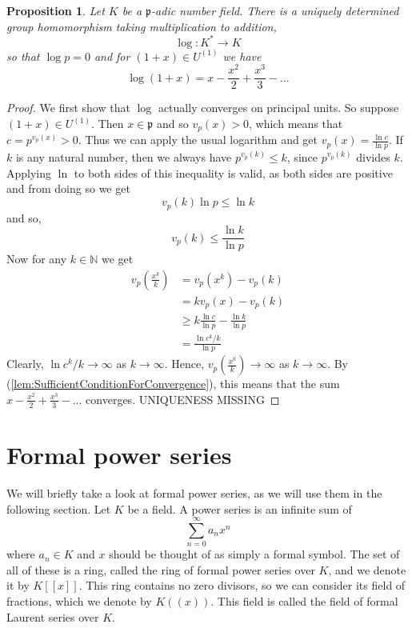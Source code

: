\documentclass{article}
\newtheorem{proposition}{Proposition}[section]
\newcommand{\mfrak}[1]{\mathfrak{#1}}
\newcommand{\mbb}[1]{\mathbb{#1}}
\begin{document}
\begin{proposition}
    Let $K$ be a $\mfrak{p}$-adic number field. There is a uniquely determined group homomorphism taking multiplication to addition,
    $$\log : K^* \to K$$
    so that $\log p = 0$ and for $(1 + x) \in U^{(1)}$ we have
    $$\log (1 + x) = x - \frac{x^2}{2} + \frac{x^3}{3} - ...$$    
\end{proposition}
\begin{proof}
    We first show that $\log$ actually converges on principal units. So suppose $(1 + x) \in U^(1)$. Then $x \in \mfrak p$ and so $v_p(x) > 0$, which means that $c = p^{v_p(x)} > 0$. Thus we can apply the usual logarithm and get $v_p(x) = \frac{\ln c}{\ln p}$. If $k$ is any natural number, then we always have $p^{v_p(k)} \leq k$, since $p^{v_p(k)}$ divides $k$. Applying $\ln$ to both sides of this inequality is valid, as both sides are positive and from doing so we get 
    $$v_p(k) \ln p \leq \ln k$$
    and so,
    $$v_p(k) \leq \frac{\ln k}{\ln p}$$
    Now for any $k \in \mbb N$ we get
    \begin{align*}
        v_p(\frac{x^k}{k}) &= v_p(x^k) - v_p(k)  \\
        &= kv_p(x) - v_p(k) \\
        &\geq k \frac{\ln c}{\ln p} - \frac{\ln k}{\ln p} \\
        &= \frac{\ln c^k / k}{\ln p}
    \end{align*}
    Clearly, $\ln c^k / k \to \infty$ as $k \to \infty$. Hence, $v_p(\frac{x^k}{k}) \to \infty$ as $k \to \infty$. By (\ref{lem:SufficientConditionForConvergence}), this means that the sum $x - \frac{x^2}{2} + \frac{x^3}{3} - ...$ converges. UNIQUENESS MISSING
\end{proof}

\section{Formal power series}
We will briefly take a look at formal power series, as we will use them in the following section. Let $K$ be a field. A power series is an infinite sum of 
$$\sum_{n=0}^\infty a_n x^n$$
where $a_n \in K$ and $x$ should be thought of as simply a formal symbol. The set of all of these is a ring, called the ring of formal power series over $K$, and we denote it by $K[[x]]$. This ring contains no zero divisors, so we can consider its field of fractions, which we denote by $K((x))$. This field is called the field of formal Laurent series over $K$. 
\end{document}
